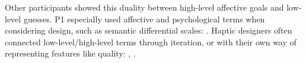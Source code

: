 




Other participants showed this duality between high-level affective goals and low-level guesses.
P1 especially used affective and psychological terms when considering design, such as semantic differential scales:
.
Haptic designers often connected low-level/high-level terms through iteration, or with their own way of representing features like quality:
,
.







